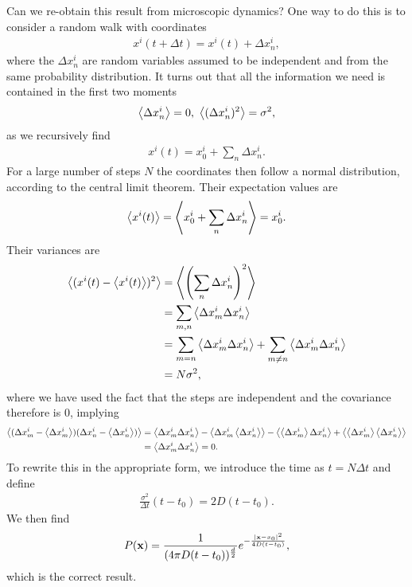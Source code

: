 Can we re-obtain this result from microscopic dynamics? One way to do this is to consider a random walk with coordinates
\begin{align*}
	x^{i}(t + \Delta t) = x^{i}(t) + \Delta x_{n}^{i},
\end{align*}
where the $\Delta x_{n}^{i}$ are random variables assumed to be independent and from the same probability distribution. It turns out that all the information we need is contained in the first two moments
\begin{align*}
	\expval{\Delta x_{n}^{i}} = 0,\ \expval{(\Delta x_{n}^{i})^{2}} = \sigma^{2},
\end{align*}
as we recursively find
\begin{align*}
	x^{i}(t) = x^{i}_{0} + \sum\limits_{n}\Delta x_{n}^{i}.
\end{align*}
For a large number of steps $N$ the coordinates then follow a normal distribution, according to the central limit theorem. Their expectation values are
\begin{align*}
	\expval{x^{i}(t)} = \expval{x^{i}_{0} + \sum\limits_{n}\Delta x_{n}^{i}} = x^{i}_{0}.
\end{align*}
Their variances are
\begin{align*}
	\expval{(x^{i}(t) - \expval{x^{i}(t)})^{2}} &= \expval{\left(\sum\limits_{n}\Delta x_{n}^{i}\right)^{2}} \\
	                                            &= \sum\limits_{m, n}\expval{\Delta x_{m}^{i}\Delta x_{n}^{i}} \\
	                                            &= \sum\limits_{m = n}\expval{\Delta x_{m}^{i}\Delta x_{n}^{i}} + \sum\limits_{m \neq n}\expval{\Delta x_{m}^{i}\Delta x_{n}^{i}} \\
	                                            &= N\sigma^{2},
\end{align*}
where we have used the fact that the steps are independent and the covariance therefore is $0$, implying
\begin{align*}
	\expval{(\Delta x_{m}^{i} - \expval{\Delta x_{m}^{i}})(\Delta x_{n}^{i} - \expval{\Delta x_{n}^{i}})} &= \expval{\Delta x_{m}^{i}\Delta x_{n}^{i}} - \expval{\Delta x_{m}^{i}\expval{\Delta x_{n}^{i}}} - \expval{\expval{\Delta x_{m}^{i}}\Delta x_{n}^{i}} + \expval{\expval{\Delta x_{m}^{i}}\expval{\Delta x_{n}^{i}}} \\
	             &= \expval{\Delta x_{m}^{i}\Delta x_{n}^{i}} = 0.
\end{align*}
To rewrite this in the appropriate form, we introduce the time as $t = N\Delta t$ and define
\begin{align*}
	\frac{\sigma^{2}}{\Delta t}(t - t_{0}) = 2D(t - t_{0}).
\end{align*}
We then find
\begin{align*}
	P(\vb{x}) = \frac{1}{(4\pi D(t - t_{0}))^{\frac{d}{2}}}e^{-\frac{\abs{\vb{x} - x_{0}}^{2}}{4D(t - t_{0})}},
\end{align*}
which is the correct result.

